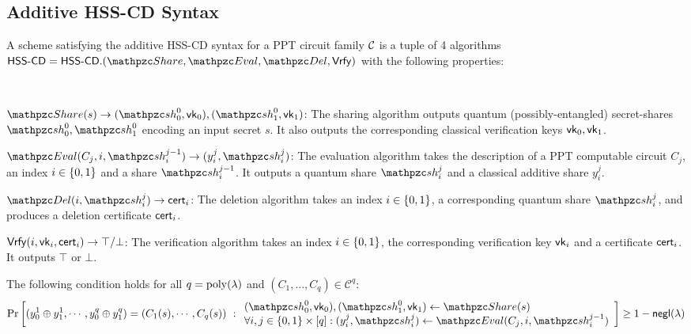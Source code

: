 \subsection{Additive HSS-CD Syntax}

A scheme satisfying the additive HSS-CD syntax for a PPT circuit
family $\mathcal{C}$ is a tuple of 4 algorithms $\HSScd = \HSScd.(\Sh,
\Ev, \Del, \Vrfy)$ with the following properties:

\begin{description}

\item [Syntax:] $ $
\item $\Sh(s) \rightarrow (\qsh_0^0, \vk_0), (\qsh_1^0,
\vk_1)$: The sharing algorithm outputs quantum
(possibly-entangled) secret-shares $\qsh_0^0, \qsh_1^0$ encoding an
input secret $s$. It also outputs the corresponding classical
verification keys $\mathsf{vk}_0, \mathsf{vk}_1$.

\item $\Ev(C_j, i, \qsh_i^{j-1}) \rightarrow (y_i^j, \qsh_i^{j})$:
The
evaluation algorithm takes the description of a PPT computable
circuit $C_j$, an index $i \in \{0,1\}$ and a share
$\qsh_i^{j-1}$. It outputs a quantum share $\qsh_i^j$ and a
classical additive share $y_i^j$.

\item $\Del(i, \qsh_i^j) \rightarrow \cert_i$: The deletion
algorithm takes an index $i \in \{0,1\}$, a corresponding quantum share
$\qsh_i^j$, and produces a deletion certificate $\mathsf{cert}_i$.

\item $\mathsf{Vrfy}(i, \mathsf{vk}_i, \mathsf{cert}_i) \rightarrow \top/\bot$: The
verification algorithm takes an index $i \in \{0,1\}$, the
corresponding verification key $\mathsf{vk}_i$ and a certificate $\mathsf{cert}_i$.
It outputs $\top$ or $\bot$.

\item [Evaluation Correctness:] The following
condition holds for all $q = {\mathrm{poly}}(\lambda)$ and $(C_1, \ldots, C_q)
\in \mathcal{C}^q$:
\begin{align}
\Pr\left[
(y_0^1 \xor y_1^1, \cdots, y_0^q \xor y_1^q) = (C_1(s), \cdots,
C_q(s))
\ :
\begin{array}{ll}
(\qsh_0^0, \vk_0), (\qsh_1^0, \vk_1) \gets \Sh(s)\\
\forall i,j \in \bit \times [q]: (y_i^j, \qsh_i^j)
\leftarrow \Ev(C_j, i,
\qsh_i^{j-1})
\end{array}
\right] \geq 1 - \negl(\secp)
\end{align}


\end{description}
